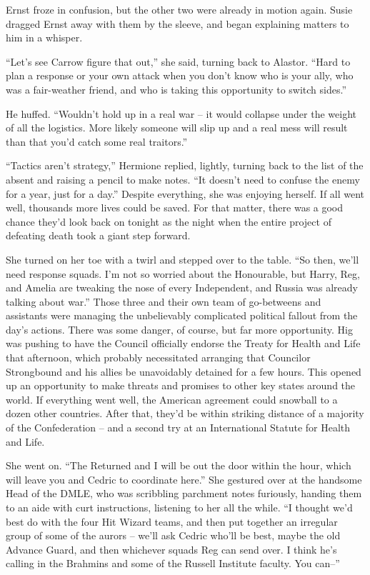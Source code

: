 Ernst froze in confusion, but the other two were already in motion
again. Susie dragged Ernst away with them by the sleeve, and began
explaining matters to him in a whisper.

``Let's see Carrow figure that out,'' she said, turning back to Alastor.
``Hard to plan a response or your own attack when you don't know who is
your ally, who was a fair-weather friend, and who is taking this
opportunity to switch sides.''

He huffed. ``Wouldn't hold up in a real war -- it would collapse under
the weight of all the logistics. More likely someone will slip up and a
real mess will result than that you'd catch some real traitors.''

``Tactics aren't strategy,'' Hermione replied, lightly, turning back to
the list of the absent and raising a pencil to make notes. ``It doesn't
need to confuse the enemy for a year, just for a day.'' Despite
everything, she was enjoying herself. If all went well, thousands more
lives could be saved. For that matter, there was a good chance they'd
look back on tonight as the night when the entire project of defeating
death took a giant step forward.

She turned on her toe with a twirl and stepped over to the table. ``So
then, we'll need response squads. I'm not so worried about the
Honourable, but Harry, Reg, and Amelia are tweaking the nose of every
Independent, and Russia was already talking about war.'' Those three and
their own team of go-betweens and assistants were managing the
unbelievably complicated political fallout from the day's actions. There
was some danger, of course, but far more opportunity. Hig was pushing to
have the Council officially endorse the Treaty for Health and Life that
afternoon, which probably necessitated arranging that Councilor
Strongbound and his allies be unavoidably detained for a few hours. This
opened up an opportunity to make threats and promises to other key
states around the world. If everything went well, the American agreement
could snowball to a dozen other countries. After that, they'd be within
striking distance of a majority of the Confederation -- and a second try
at an International Statute for Health and Life.

She went on. ``The Returned and I will be out the door within the hour,
which will leave you and Cedric to coordinate here.'' She gestured over
at the handsome Head of the DMLE, who was scribbling parchment notes
furiously, handing them to an aide with curt instructions, listening to
her all the while. ``I thought we'd best do with the four Hit Wizard
teams, and then put together an irregular group of some of the aurors --
we'll ask Cedric who'll be best, maybe the old Advance Guard, and then
whichever squads Reg can send over. I think he's calling in the Brahmins
and some of the Russell Institute faculty. You can--''


